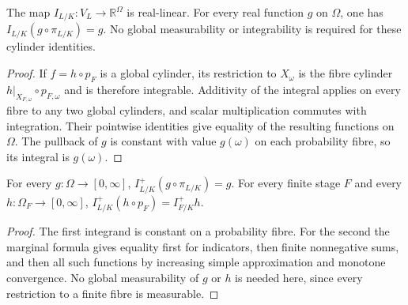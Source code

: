 \begin{lemma}
\label{lem:global-cylinder-functional}
\leanok
{}
The map $I_{L/K}:V_L\to\mathbb R^\Omega$ is real-linear. For every
real function $g$ on $\Omega$, one has $I_{L/K}(g\circ\pi_{L/K})=g$.
No global measurability or integrability is required for these cylinder identities.
\end{lemma}
\begin{proof}
If $f=h\circ p_F$ is a global cylinder, its restriction to $X_\omega$
is the fibre cylinder $h|_{X_{F,\omega}}\circ p_{F,\omega}$ and is
therefore integrable. Additivity of the integral applies on every fibre
to any two global cylinders, and scalar multiplication commutes with
integration. Their pointwise identities give equality of the resulting
functions on $\Omega$. The pullback of $g$ is constant with value
$g(\omega)$ on each probability fibre, so its integral is $g(\omega)$.
\end{proof}


\begin{lemma}\label{lem:algebraic-lintegral-pullback}
\leanok
{}
For every $g:\Omega\to[0,\infty]$, $I^+_{L/K}(g\circ\pi_{L/K})=g$.
For every finite stage $F$ and every $h:\Omega_F\to[0,\infty]$,
$I^+_{L/K}(h\circ p_F)=I^+_{F/K}h$.
\end{lemma}
\begin{proof}
The first integrand is constant on a probability fibre.
For the second the marginal formula gives
equality first for indicators, then finite nonnegative sums, and then
all such functions by increasing simple approximation and monotone
convergence. No global measurability of $g$ or $h$ is needed here,
since every restriction to a finite fibre is measurable.
\end{proof}

